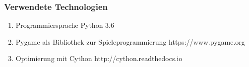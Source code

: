 



\begin{frame}
\frametitle{Verwendete Technologien}

\begin{enumerate}
	\item Programmiersprache Python 3.6
	\item Pygame als Bibliothek zur Spieleprogrammierung https://www.pygame.org
	\item Optimierung mit Cython http://cython.readthedocs.io
\end{enumerate}

\end{frame}
